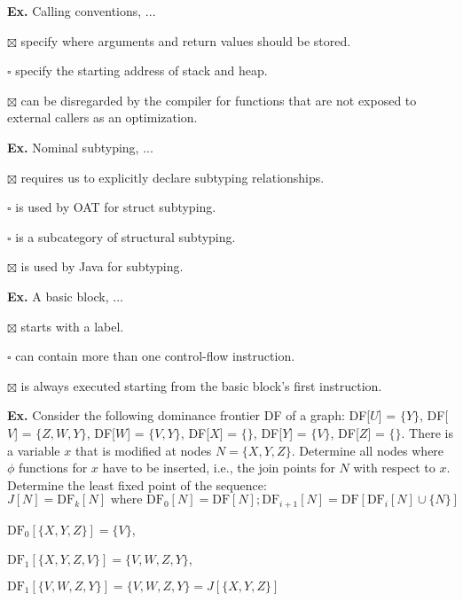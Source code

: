 \hrulefill

\textbf{Ex.} Calling conventions, ...
\begin{compactitem}
	\item[$\boxtimes$] specify where arguments and return values should be stored.
	\item[$\square$] specify the starting address of stack and heap.
	\item[$\boxtimes$] can be disregarded by the compiler for functions that are not exposed to external callers as an optimization.
\end{compactitem}

\hrulefill

\textbf{Ex.} Nominal subtyping, ...
\begin{compactitem} 
	\item[$\boxtimes$] requires us to explicitly declare subtyping relationships.
	\item[$\square$] is used by OAT for struct subtyping.
	\item[$\square$] is a subcategory of structural subtyping.
	\item[$\boxtimes$] is used by Java for subtyping.
\end{compactitem}

\hrulefill

\textbf{Ex.} A basic block, ...
\begin{compactitem}
	\item[$\boxtimes$] starts with a label.
	\item[$\square$] can contain more than one control-flow instruction.
	\item[$\boxtimes$] is always executed starting from the basic block's first instruction.
\end{compactitem}

\hrulefill

\textbf{Ex.} Consider the following dominance frontier DF of a graph:
DF[$ U $] = $\{ Y \}$,
DF[$ V $] = $\{ Z, W, Y \}$,
DF[$ W $] = $\{ V, Y \}$,
DF[$ X $] = $\{  \}$,
DF[$ Y $] = $\{ V \}$,
DF[$ Z $] = $\{  \}$.
There is a variable $x$ that is modified at nodes $N = \{X, Y, Z\}$. Determine all nodes
where $\phi$ functions for $x$ have to be inserted, i.e., the join points for $N$ with respect to $x$.
Determine the least fixed point of the sequence:
$$J[N] = \text{DF}_k[N] \text{ where } \text{DF}_0[N] = \text{DF}[N]; \text{DF}_{i+1}[N] = \text{DF}[\text{DF}_i[N] \cup \{N\}]$$\smallskip

$\text{DF}_0[\{X, Y, Z\}] = \{V\}$, 

$\text{DF}_1[\{X, Y, Z, V\}] = \{V, W, Z, Y\}$, 

$\text{DF}_1[\{V, W, Z, Y\}] = \{V, W, Z, Y\} = J[\{X, Y, Z\}]$

\hrulefill